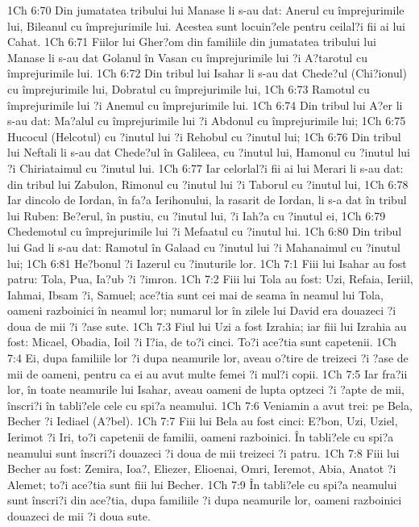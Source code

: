 1Ch 6:70  Din jumatatea tribului lui Manase li s-au dat: Anerul cu împrejurimile lui, Bileanul cu împrejurimile lui. Acestea sunt locuin?ele pentru ceilal?i fii ai lui Cahat.
1Ch 6:71  Fiilor lui Gher?om din familiile din jumatatea tribului lui Manase li s-au dat Golanul în Vasan cu împrejurimile lui ?i A?tarotul cu împrejurimile lui.
1Ch 6:72  Din tribul lui Isahar li s-au dat Chede?ul (Chi?ionul) cu împrejurimile lui, Dobratul cu împrejurimile lui,
1Ch 6:73  Ramotul cu împrejurimile lui ?i Anemul cu împrejurimile lui.
1Ch 6:74  Din tribul lui A?er li s-au dat: Ma?alul cu împrejurimile lui ?i Abdonul cu împrejurimile lui;
1Ch 6:75  Hucocul (Helcotul) cu ?inutul lui ?i Rehobul cu ?inutul lui;
1Ch 6:76  Din tribul lui Neftali li s-au dat Chede?ul în Galileea, cu ?inutul lui, Hamonul cu ?inutul lui ?i Chiriataimul cu ?inutul lui.
1Ch 6:77  Iar celorlal?i fii ai lui Merari li s-au dat: din tribul lui Zabulon, Rimonul cu ?inutul lui ?i Taborul cu ?inutul lui,
1Ch 6:78  Iar dincolo de Iordan, în fa?a Ierihonului, la rasarit de Iordan, li s-a dat în tribul lui Ruben: Be?erul, în pustiu, cu ?inutul lui, ?i Iah?a cu ?inutul ei,
1Ch 6:79  Chedemotul cu împrejurimile lui ?i Mefaatul cu ?inutul lui.
1Ch 6:80  Din tribul lui Gad li s-au dat: Ramotul în Galaad cu ?inutul lui ?i Mahanaimul cu ?inutul lui;
1Ch 6:81  He?bonul ?i Iazerul cu ?inuturile lor.
1Ch 7:1  Fiii lui Isahar au fost patru: Tola, Pua, Ia?ub ?i ?imron.
1Ch 7:2  Fiii lui Tola au fost: Uzi, Refaia, Ieriil, Iahmai, Ibsam ?i, Samuel; ace?tia sunt cei mai de seama în neamul lui Tola, oameni razboinici în neamul lor; numarul lor în zilele lui David era douazeci ?i doua de mii ?i ?ase sute.
1Ch 7:3  Fiul lui Uzi a fost Izrahia; iar fiii lui Izrahia au fost: Micael, Obadia, Ioil ?i I?ia, de to?i cinci. To?i ace?tia sunt capetenii.
1Ch 7:4  Ei, dupa familiile lor ?i dupa neamurile lor, aveau o?tire de treizeci ?i ?ase de mii de oameni, pentru ca ei au avut multe femei ?i mul?i copii.
1Ch 7:5  Iar fra?ii lor, în toate neamurile lui Isahar, aveau oameni de lupta optzeci ?i ?apte de mii, înscri?i în tabli?ele cele cu spi?a neamului.
1Ch 7:6  Veniamin a avut trei: pe Bela, Becher ?i Iediael (A?bel).
1Ch 7:7  Fiii lui Bela au fost cinci: E?bon, Uzi, Uziel, Ierimot ?i Iri, to?i capetenii de familii, oameni razboinici. În tabli?ele cu spi?a neamului sunt înscri?i douazeci ?i doua de mii treizeci ?i patru.
1Ch 7:8  Fiii lui Becher au fost: Zemira, Ioa?, Eliezer, Elioenai, Omri, Ieremot, Abia, Anatot ?i Alemet; to?i ace?tia sunt fiii lui Becher.
1Ch 7:9  În tabli?ele cu spi?a neamului sunt înscri?i din ace?tia, dupa familiile ?i dupa neamurile lor, oameni razboinici douazeci de mii ?i doua sute.
